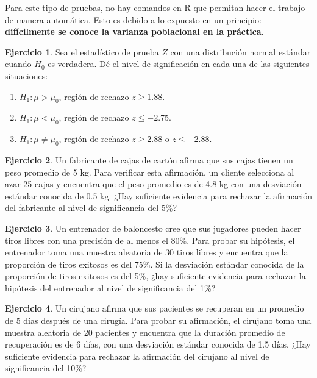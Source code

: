 \documentclass[
]{book}
\providecommand{\tightlist}{%
  \setlength{\itemsep}{0pt}\setlength{\parskip}{0pt}}
\theoremstyle{definition}
\theoremstyle{definition}
\theoremstyle{definition}
\newtheorem{exercise}{Ejercicio}[chapter]
\theoremstyle{definition}
\theoremstyle{remark}
\begin{document}
Para este tipo de pruebas, no hay comandos en R que permitan hacer el trabajo de manera automática. Esto es debido a lo expuesto en un principio: \textbf{difícilmente se conoce la varianza poblacional en la práctica}.

\begin{exercise}

Sea el estadístico de prueba \(Z\) con una distribución normal estándar cuando \(H_0\) es verdadera. Dé el nivel de significación en cada una de las siguientes situaciones:

\begin{enumerate}
\def\labelenumi{\alph{enumi}.}
\tightlist
\item
  \(H_1: \mu > \mu_0\), región de rechazo \(z\geq 1.88\).
\item
  \(H_1: \mu < \mu_0\), región de rechazo \(z\leq -2.75\).
\item
  \(H_1: \mu \neq \mu_0\), región de rechazo \(z\geq 2.88\) o \(z\leq -2.88\).
\end{enumerate}

\end{exercise}

\begin{exercise}
Un fabricante de cajas de cartón afirma que sus cajas tienen un peso promedio de 5 kg. Para verificar esta afirmación, un cliente selecciona al azar 25 cajas y encuentra que el peso promedio es de 4.8 kg con una desviación estándar conocida de 0.5 kg. ¿Hay suficiente evidencia para rechazar la afirmación del fabricante al nivel de significancia del 5\%?
\end{exercise}

\begin{exercise}
Un entrenador de baloncesto cree que sus jugadores pueden hacer tiros libres con una precisión de al menos el 80\%. Para probar su hipótesis, el entrenador toma una muestra aleatoria de 30 tiros libres y encuentra que la proporción de tiros exitosos es del 75\%. Si la desviación estándar conocida de la proporción de tiros exitosos es del 5\%, ¿hay suficiente evidencia para rechazar la hipótesis del entrenador al nivel de significancia del 1\%?
\end{exercise}

\begin{exercise}
Un cirujano afirma que sus pacientes se recuperan en un promedio de 5 días después de una cirugía. Para probar su afirmación, el cirujano toma una muestra aleatoria de 20 pacientes y encuentra que la duración promedio de recuperación es de 6 días, con una desviación estándar conocida de 1.5 días. ¿Hay suficiente evidencia para rechazar la afirmación del cirujano al nivel de significancia del 10\%?
\end{exercise}
\end{document}
